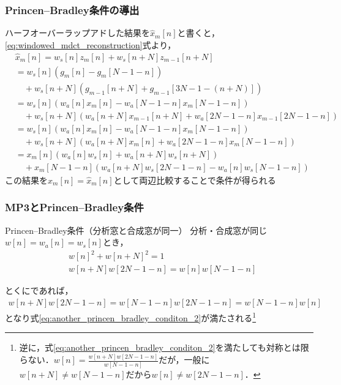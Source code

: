 \documentclass[14pt,xcolor=dvipsnames,table,dvipdfmx]{beamer}
\begin{document}
\begin{frame}[c]
    \frametitle{Princen--Bradley条件の導出}
    ハーフオーバーラップアドした結果を$\hat{x}_{m}[n]$と書くと，\eqref{eq:windowed_mdct_reconstruction}式より，
    \footnotesize
    \begin{align*}
        &\hat{x}_{m}[n] = w_{s}[n]z_{m}[n] + w_{s}[n + N]z_{m-1}[n + N] \\
        &= w_{s}[n] (g_{m}[n] - g_{m}[N - 1 - n]) \\
        &\quad + w_{s}[n + N] (g_{m-1}[n + N] + g_{m-1}[3N - 1 - (n + N)]) \\
        &= w_{s}[n] (w_{a}[n] x_{m}[n] - w_{a}[N - 1 - n]x_{m}[N - 1 - n]) \\
        &\quad + w_{s}[n + N] (w_{a}[n + N] x_{m-1}[n + N] + w_{a}[2N - 1 - n]x_{m-1}[2N - 1 - n]) \\
        &= w_{s}[n] (w_{a}[n] x_{m}[n] - w_{a}[N - 1 - n]x_{m}[N - 1 - n]) \\
        &\quad + w_{s}[n + N] (w_{a}[n + N] x_{m}[n] + w_{a}[2N - 1 - n]x_{m}[N - 1 - n]) \\
        &= x_{m}[n](w_{a}[n] w_{s}[n] + w_{a}[n + N]w_{s}[n + N]) \\
        &\quad + x_{m}[N - 1 - n](w_{a}[n + N] w_{s}[2N - 1 - n] - w_{a}[n]w_{s}[N - 1 - n])
    \end{align*}
    \normalsize
    この結果を$x_{m}[n] = \hat{x}_{m}[n]$として両辺比較することで条件が得られる
\end{frame}

\begin{frame}[c]
    \frametitle{MP3とPrincen--Bradley条件}
    \begin{block}{Princen--Bradley条件（分析窓と合成窓が同一）}
        分析・合成窓が同じ$w[n] = w_{a}[n] = w_{s}[n]$とき，
        \begin{align}
            & w[n]^{2} + w[n + N]^{2} = 1 \label{eq:another_princen_bradley_conditon_1} \\
            & w[n + N] w[2N - 1 - n] = w[n]w[N - 1 - n] \label{eq:another_princen_bradley_conditon_2}
        \end{align}
    \end{block}
    とくにであれば，
    \footnotesize
    \begin{align*}
        w[n + N] w[2N - 1 - n] = w[N - 1 - n]w[2N - 1 - n] = w[N - 1 - n]w[n]
    \end{align*}
    \normalsize
    となり式\eqref{eq:another_princen_bradley_conditon_2}が満たされる\footnote{逆に，式\eqref{eq:another_princen_bradley_conditon_2}を満たしても対称とは限らない．$w[n] = \frac{w[n + N]w[2N - 1 - n]}{w[N - 1 - n]}$だが，一般に$w[n + N] \neq w[N - 1 - n]$だから$w[n] \neq w[2N - 1 - n]$．}
\end{frame}
\end{document}
